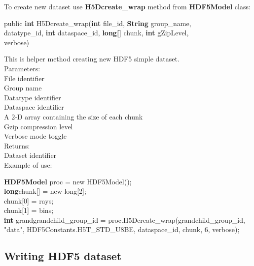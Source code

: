 \documentclass[11p]{article}
\begin{document}
To create new dataset use {\bf H5Dcreate\_wrap} method from {\bf
HDF5Model} class:
\begin{kod}
public {\bf int} H5Dcreate\_wrap({\bf int} file\_id, {\bf String} group\_name,\\
\hspace*{0.5cm}{\bf int} datatype\_id, {\bf int} dataspace\_id, {\bf long[]}
chunk, {\bf int} gZipLevel,\\
\hspace*{0.5cm}{\bf boolean} verbose)
\end{kod}
This is helper method creating new HDF5 simple dataset.\\
Parameters:\\
\hspace*{0.5cm}{\bf file\_id} File identifier\\
\hspace*{0.5cm}{\bf group\_name} Group name\\
\hspace*{0.5cm}{\bf datatype\_id} Datatype identifier\\
\hspace*{0.5cm}{\bf dataspace\_id} Dataspace identifier\\
\hspace*{0.5cm}{\bf chunk} A 2-D array containing the size of each chunk\\
\hspace*{0.5cm}{\bf gZipLevel} Gzip compression level\\
\hspace*{0.5cm}{\bf verbose} Verbose mode toggle\\
Returns:\\
\hspace*{0.5cm}Dataset identifier\\

Example of use:
\begin{kod}
{\bf HDF5Model} proc = new HDF5Model();\\
{\bf long}chunk[] = new long[2];\\
chunk[0] = rays;\\
chunk[1] = bins;\\
{\bf int} grandgrandchild\_group\_id =
proc.H5Dcreate\_wrap(grandchild\_group\_id,\\ "data",
HDF5Constants.H5T\_STD\_U8BE, dataspace\_id, chunk, 6, verbose);
\end{kod}

\subsection{Writing HDF5 dataset}
\end{document}
